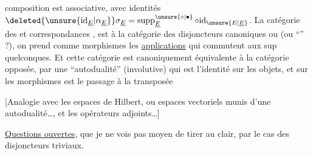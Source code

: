 composition est associative, avec  identités $\deleted{\unsure{\mathrm{id}_{\underline E}|\alpha_{\underline E}}}\sigma_{\underline E}=\operatorname{supp}^{\unsure{\circ|\bullet}}_{\underline E}\circ\mathrm{id}_{\unsure{E|\underline E}}$. La catégorie des  et correspondances  , est  à la catégorie des disjoncteurs canoniques ou  (ou ``\uline{}'' ?),  on prend comme morphismes les \uline{applications}  qui commutent aux sup quelconques. Et cette catégorie est canoniquement équivalente à la catégorie opposée, par une ``autodualité'' (involutive) qui est l'identité sur les objets, et sur les morphismes est le passage à la  transposée

[Analogie avec les espaces de Hilbert, ou  espaces vectoriels munis d'une autodualité\ldots, et les opérateurs adjoints\ldots]

\uline{Questions ouvertes}, que je ne vois pas moyen de tirer au clair,  par le cas des disjoncteurs triviaux.
